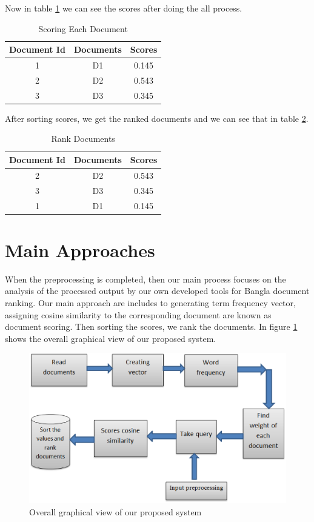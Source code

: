 Now in table \ref{tab:Scoring} we can see the scores after doing the all process.

\begin{table}[htp]	
\centering

\caption{Scoring Each Document  }
\vspace{0.5cm}
\begin{tabular}{|c|c|c|} 
\hline

	\textbf{Document Id }& \textbf{Documents} & \textbf{Scores} \\ \hline
 1 & D1 &	0.145   \\ \hline
 2 & D2 & 0.543   \\ \hline
 3 & D3  &0.345   \\ \hline


\end{tabular}
\label{tab:Scoring}
\end{table}

After sorting scores, we get the ranked documents and we can see that in table \ref{tab:Rank}.


\begin{table}[htp]	
\centering
\caption{Rank Documents  }
\vspace{0.5cm}
\begin{tabular}{|c|c|c|} 
\hline

\textbf{Document Id}  & \textbf{Documents} & \textbf{Scores} \\ \hline
 2 & D2 &	0.543   \\ \hline
 3 & D3 & 0.345   \\ \hline
 1 & D1 &0.145  \\ \hline


\end{tabular}
\label{tab:Rank}
\end{table}


\section{Main Approaches}

When the preprocessing is completed, then our main process focuses on the analysis of the processed output by our own developed tools for Bangla document ranking. Our main approach are includes to generating term frequency vector, assigning cosine similarity to the corresponding document are known as document scoring. Then sorting the scores, we rank the documents. In figure \ref{Figure:graphical} shows the overall graphical view of our proposed system.

\begin{figure}[htp]
	\centering
		\includegraphics[width=.65\textwidth]{figure/five.eps}
	\caption{Overall graphical view of our proposed system}
	\label{Figure:graphical}
\end{figure}

